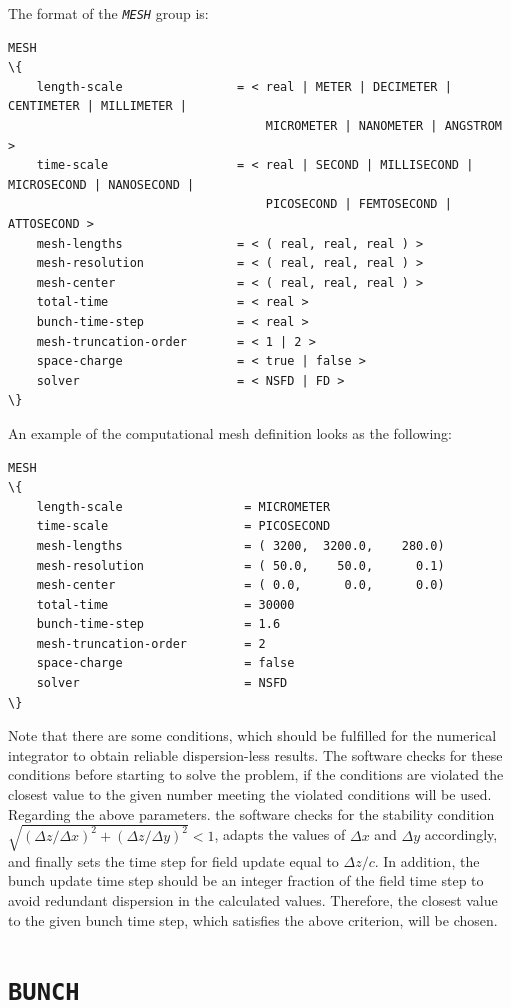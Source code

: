 The format of the {\tt \em \small MESH} group is:
%
\begin{Verbatim}[frame=single, fontsize=\small, tabsize=4, fontfamily=courier, fontseries=b, commandchars=\\\{\}, obeytabs]
MESH
\{
	length-scale				= < real | METER | DECIMETER | CENTIMETER | MILLIMETER | 
									MICROMETER | NANOMETER | ANGSTROM >
	time-scale					= < real | SECOND | MILLISECOND | MICROSECOND | NANOSECOND | 
									PICOSECOND | FEMTOSECOND |	ATTOSECOND >
	mesh-lengths				= < ( real, real, real ) >
	mesh-resolution		 		= < ( real, real, real ) >
	mesh-center				 	= < ( real, real, real ) >
	total-time					= < real >
	bunch-time-step		 		= < real >
	mesh-truncation-order 		= < 1 | 2 >
	space-charge  				= < true | false >
	solver						= < NSFD | FD >
\}
\end{Verbatim}
An example of the computational mesh definition looks as the following:
\begin{snugshade}
\begin{Verbatim}[fontsize=\small, tabsize=4, fontfamily=courier, fontseries=b, commandchars=\\\{\}, obeytabs]
MESH
\{
	length-scale 				 = MICROMETER
	time-scale					 = PICOSECOND
	mesh-lengths				 = ( 3200,  3200.0,    280.0)
	mesh-resolution				 = ( 50.0,    50.0,      0.1)
	mesh-center					 = ( 0.0,      0.0,      0.0)
	total-time 					 = 30000
	bunch-time-step				 = 1.6
	mesh-truncation-order		 = 2
	space-charge				 = false
	solver						 = NSFD
\}
\end{Verbatim}
\end{snugshade}
%
Note that there are some conditions, which should be fulfilled for the numerical integrator to obtain reliable dispersion-less results.
%
The software checks for these conditions before starting to solve the problem, if the conditions are violated the closest value to the given number meeting the violated conditions will be used.
%
Regarding the above parameters. the software checks for the stability condition $\sqrt{(\Delta z/\Delta x)^2+ (\Delta z/\Delta y)^2} < 1$, adapts the values of $\Delta x$ and $\Delta y$ accordingly, and finally sets the time step for field update equal to $\Delta z / c$.
%
In addition, the bunch update time step should be an integer fraction of the field time step to avoid redundant dispersion in the calculated values.
%
Therefore, the closest value to the given bunch time step, which satisfies the above criterion, will be chosen.

\section{\texttt{BUNCH}}


